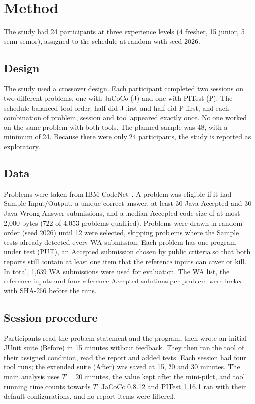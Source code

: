\section{Method}
\label{sec:methods}

The study had 24 participants at three experience levels (4 fresher, 15 junior, 5 semi-senior), assigned to the schedule at random with seed 2026.

\subsection{Design}
The study used a crossover design. Each participant completed two sessions on two different problems, one with JaCoCo (J) and one with PITest (P). The schedule balanced tool order: half did J first and half did P first, and each combination of problem, session and tool appeared exactly once. No one worked on the same problem with both tools. The planned sample was 48, with a minimum of 24. Because there were only 24 participants, the study is reported as exploratory.

\subsection{Data}
Problems were taken from IBM CodeNet~\cite{puri2021}. A problem was eligible if it had Sample Input/Output, a unique correct answer, at least 30 Java Accepted and 30 Java Wrong Answer submissions, and a median Accepted code size of at most 2,000 bytes (722 of 4,053 problems qualified). Problems were drawn in random order (seed 2026) until 12 were selected, skipping problems where the Sample tests already detected every WA submission. Each problem has one program under test (PUT), an Accepted submission chosen by public criteria so that both reports still contain at least one item that the reference inputs can cover or kill. In total, 1,639 WA submissions were used for evaluation. The WA list, the reference inputs and four reference Accepted solutions per problem were locked with SHA-256 before the runs.

\subsection{Session procedure}
Participants read the problem statement and the program, then wrote an initial JUnit suite (Before) in 15 minutes without feedback. They then ran the tool of their assigned condition, read the report and added tests. Each session had four tool runs; the extended suite (After) was saved at 15, 20 and 30 minutes. The main analysis uses $T = 20$ minutes, the value kept after the mini-pilot, and tool running time counts towards $T$. JaCoCo 0.8.12 and PITest 1.16.1 ran with their default configurations, and no report items were filtered.


